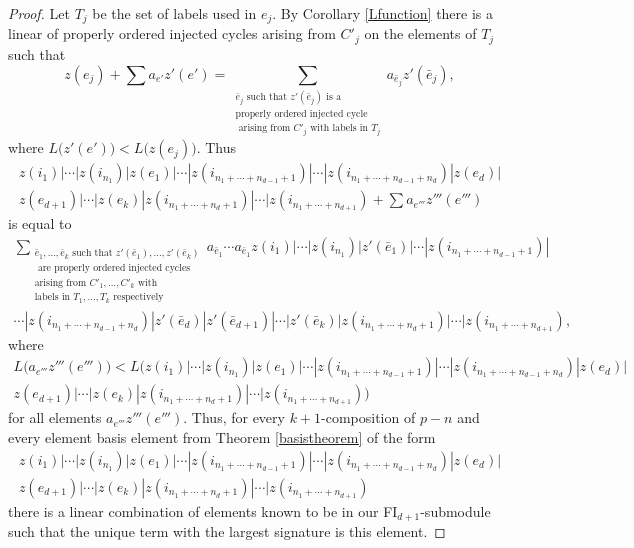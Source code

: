 \documentclass[12py]{amsart}%
\theoremstyle{definition}\newtheorem{definition}[thm]{Definition}
\theoremstyle{definition}
\begin{document}
\begin{proof}
Let $T_{j}$ be the set of labels used in $e_{j}$. By Corollary \ref{Lfunction} there is a linear of properly ordered injected cycles arising from $C'_{j}$ on the elements of $T_{j}$ such that
\[
z(e_{j})+\sum a_{e'}z'(e')=\sum_{\substack{\bar{e}_{j} \text{ such that }z'(\bar{e}_{j})\text{ is a }\\\text{properly ordered injected cycle }\\\text{ arising from }C'_{j}\text{ with labels in }T_{j}}}a_{\bar{e}_{j}}z'(\bar{e}_{j}),
\]
where $L\big(z'(e')\big)<L\big(z(e_{j})\big)$. Thus
\begin{multline*}
z(i_{1})|\cdots|z(i_{n_{1}})|z(e_{1})|\cdots|z(i_{n_{1}+\cdots+n_{d-1}+1})|\cdots|z(i_{n_{1}+\cdots+n_{d-1}+n_{d}})|z(e_{d})|\\
z(e_{d+1})|\cdots|z(e_{k})|z(i_{n_{1}+\cdots+n_{d}+1})|\cdots|z(i_{n_{1}+\cdots+n_{d+1}})+\sum a_{e'''}z'''(e''')
\end{multline*}
is equal to
\begin{multline*}
\sum_{\substack{\bar{e}_{1},\dots, \bar{e}_{k}\text{ such that } z'(\bar{e}_{1}),\dots, z'(\bar{e}_{k})\\\text{ are properly ordered injected cycles }\\\text{arising from } C'_{1},\dots, C'_{k} \text{ with}\\\text{labels in }T_{1},\dots, T_{k}\text{ respectively}}}a_{\bar{e}_{1}}\cdots a_{\bar{e}_{1}}z(i_{1})|\cdots|z(i_{n_{1}})|z'(\bar{e}_{1})|\cdots|z(i_{n_{1}+\cdots+n_{d-1}+1})|\\\cdots|z(i_{n_{1}+\cdots+n_{d-1}+n_{d}})|z'(\bar{e}_{d})|z'(\bar{e}_{d+1})|\cdots|z'(\bar{e}_{k})|z(i_{n_{1}+\cdots+n_{d}+1})|\cdots|z(i_{n_{1}+\cdots+n_{d+1}}),
\end{multline*}
where
\begin{multline*}
L\big(a_{e'''}z'''(e''')\big)<L\big(z(i_{1})|\cdots|z(i_{n_{1}})|z(e_{1})|\cdots|z(i_{n_{1}+\cdots+n_{d-1}+1})|\cdots|z(i_{n_{1}+\cdots+n_{d-1}+n_{d}})|z(e_{d})|\\
z(e_{d+1})|\cdots|z(e_{k})|z(i_{n_{1}+\cdots+n_{d}+1})|\cdots|z(i_{n_{1}+\cdots+n_{d+1}})\big)
\end{multline*}
for all elements $a_{e'''}z'''(e''')$. Thus, for every $k+1$-composition of $p-n$ and every element basis element from Theorem \ref{basistheorem} of the form
\begin{multline*}
z(i_{1})|\cdots|z(i_{n_{1}})|z(e_{1})|\cdots|z(i_{n_{1}+\cdots+n_{d-1}+1})|\cdots|z(i_{n_{1}+\cdots+n_{d-1}+n_{d}})|z(e_{d})|\\
z(e_{d+1})|\cdots|z(e_{k})|z(i_{n_{1}+\cdots+n_{d}+1})|\cdots|z(i_{n_{1}+\cdots+n_{d+1}})
\end{multline*}
there is a linear combination of elements known to be in our FI$_{d+1}$-submodule such that the unique term with the largest signature is this element.


\end{proof}
\end{document}
